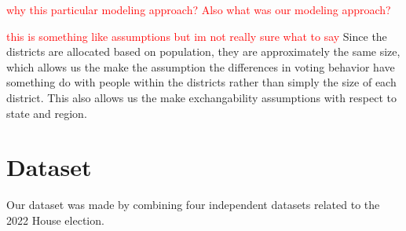 \documentclass[12pt]{article}
\newcommand{\red}[1]{\textcolor{red}{#1}}
\begin{document}
\red{why this particular modeling approach? Also what was our modeling approach?}






\textcolor{red}{this is something like assumptions but im not really sure what to say}
Since the districts are allocated based on population, they are approximately the same size, which allows us the make the assumption the differences in voting behavior have something do with people within the districts rather than simply the size of each district. This also allows us the make exchangability assumptions with respect to state and region.




\section{Dataset}
Our dataset was made by combining four independent datasets related to the 2022 House election. 

\end{document}
